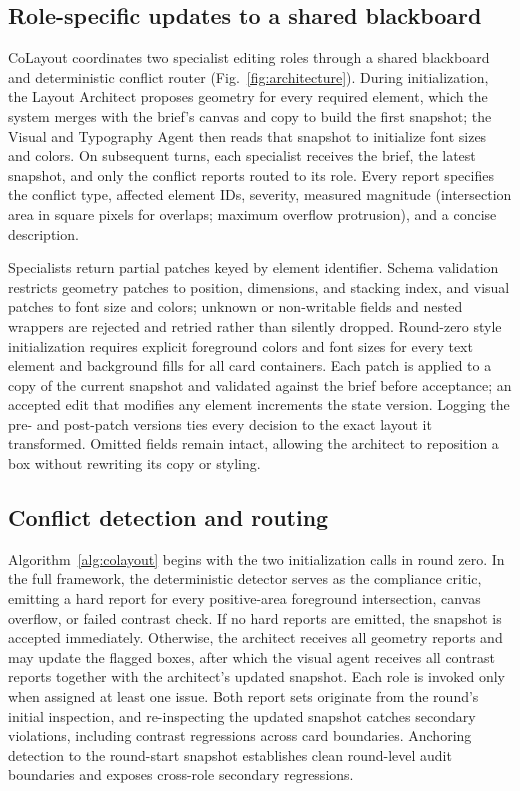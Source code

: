 \subsection{Role-specific updates to a shared blackboard}
CoLayout coordinates two specialist editing roles through a shared blackboard
and deterministic conflict router (Fig.~\ref{fig:architecture}). During
initialization, the Layout Architect proposes geometry for every required
element, which the system merges with the brief's canvas and copy to build the
first snapshot; the Visual and Typography Agent then reads that snapshot to
initialize font sizes and colors. On subsequent turns, each specialist receives
the brief, the latest snapshot, and only the conflict reports routed to its
role. Every report specifies the conflict type, affected element IDs, severity,
measured magnitude (intersection area in square pixels for overlaps; maximum
overflow protrusion), and a concise description.

Specialists return partial patches keyed by element identifier. Schema
validation restricts geometry patches to position, dimensions, and stacking
index, and visual patches to font size and colors; unknown or non-writable
fields and nested wrappers are rejected and retried rather than silently
dropped. Round-zero style initialization requires explicit foreground colors
and font sizes for every text element and background fills for all card
containers. Each patch is applied to a copy of the current snapshot and
validated against the brief before acceptance; an accepted edit that modifies
any element increments the state version. Logging the pre- and post-patch
versions ties every decision to the exact layout it transformed. Omitted fields
remain intact, allowing the architect to reposition a box without rewriting its
copy or styling.

\subsection{Conflict detection and routing}
Algorithm~\ref{alg:colayout} begins with the two initialization calls in round
zero. In the full framework, the deterministic detector serves as the compliance
critic, emitting a hard report for every positive-area foreground intersection,
canvas overflow, or failed contrast check. If no hard reports are emitted, the
snapshot is accepted immediately. Otherwise, the architect receives all geometry
reports and may update the flagged boxes, after which the visual agent receives
all contrast reports together with the architect's updated snapshot. Each role
is invoked only when assigned at least one issue. Both report sets originate
from the round's initial inspection, and re-inspecting the updated snapshot
catches secondary violations, including contrast regressions across card
boundaries. Anchoring detection to the round-start snapshot establishes clean
round-level audit boundaries and exposes cross-role secondary regressions.

